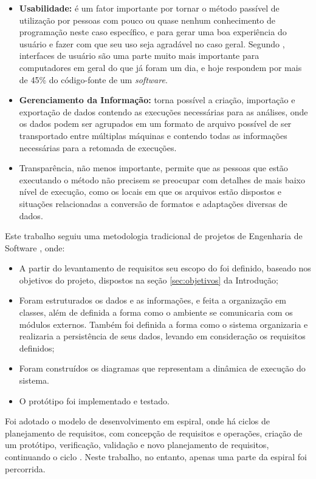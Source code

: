 \begin{itemize}
 \item{\textbf{Usabilidade:} é um fator importante por tornar o método passível de utilização por pessoas com pouco ou quase nenhum conhecimento de
programação neste caso específico, e para gerar uma boa experiência do usuário e fazer com que seu uso seja agradável no caso geral. Segundo
\cite{nielsen1993}, interfaces de usuário são uma parte muito mais importante para computadores em geral do que já foram um dia, e hoje respondem por mais
de 45\% do código-fonte de um \textit{software}.}
  \item{\textbf{Gerenciamento da Informação:} torna possível a criação, importação e exportação de dados contendo as execuções necessárias para as análises,
onde os dados podem ser agrupados em um formato de arquivo possível de ser transportado entre múltiplas máquinas e contendo todas as informações
necessárias para a retomada de execuções.}
  \item{Transparência, não menos importante, permite que as pessoas que estão executando o método não precisem se
preocupar com detalhes de mais baixo nível de execução, como os locais em que os arquivos estão dispostos e situações relacionadas a conversão de
formatos e adaptações diversas de dados.}
\end{itemize}

Este trabalho seguiu uma metodologia tradicional de projetos de Engenharia de Software \cite{softeng2005}, onde:

\begin{itemize}
  \item{A partir do levantamento de requisitos seu escopo do foi definido, baseado nos objetivos do projeto,
dispostos na seção \ref{sec:objetivos} da Introdução;}
  \item{Foram estruturados os dados e as informações, e feita a organização em classes, além de definida a forma como o ambiente
se comunicaria com os módulos externos. Também foi definida a forma como o sistema organizaria e realizaria a persistência de seus dados, levando
em consideração os requisitos definidos;}
  \item{Foram construídos os diagramas que representam a dinâmica de execução do sistema. }
  \item{O protótipo foi implementado e testado.}
\end{itemize}

Foi adotado o modelo de desenvolvimento em espiral, onde há ciclos de planejamento de requisitos, com concepção de requisitos e operações, criação
de um protótipo, verificação, validação e novo planejamento de requisitos, continuando o ciclo \cite{boehm1986}. Neste trabalho, no entanto, apenas uma
parte da espiral foi percorrida.

